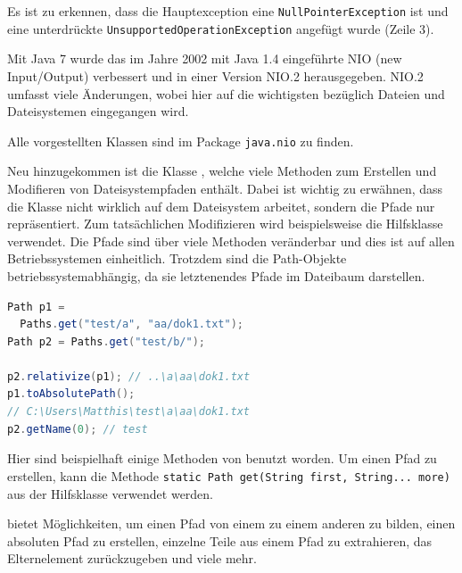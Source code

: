 \documentclass[times, 10pt,twocolumn]{article}
\begin{document}
Es ist zu erkennen, dass die Hauptexception eine \texttt{NullPointerException} ist und eine unterdrückte 
\texttt{UnsupportedOperationException} angefügt wurde (Zeile 3).

Mit Java 7 wurde das im Jahre 2002 mit Java 1.4 eingeführte NIO (new Input/Output) verbessert und in einer Version NIO.2
herausgegeben.\cite{v2bJava7} NIO.2 umfasst viele Änderungen, wobei hier auf die wichtigsten bezüglich Dateien und
Dateisystemen eingegangen wird.

Alle vorgestellten Klassen sind im Package \texttt{java.nio} zu finden.

Neu hinzugekommen ist die Klasse , welche viele Methoden zum Erstellen und Modifieren von Dateisystempfaden enthält. Dabei ist
wichtig zu erwähnen, dass die Klasse nicht wirklich auf dem Dateisystem arbeitet, sondern die Pfade nur repräsentiert. Zum tatsächlichen
Modifizieren wird beispielsweise die Hilfsklasse  verwendet. Die Pfade sind über viele Methoden veränderbar und dies ist auf
allen Betriebssystemen einheitlich. Trotzdem sind die Path-Objekte betriebssystemabhängig, da sie letztenendes Pfade 
im Dateibaum darstellen.
\begin{lstlisting}[language=java,breaklines=true]
Path p1 = 
  Paths.get("test/a", "aa/dok1.txt");
Path p2 = Paths.get("test/b/");

p2.relativize(p1); // ..\a\aa\dok1.txt
p1.toAbsolutePath(); 
// C:\Users\Matthis\test\a\aa\dok1.txt
p2.getName(0); // test
\end{lstlisting}
Hier sind beispielhaft einige Methoden von  benutzt worden. Um einen Pfad zu erstellen, kann die 
Methode \texttt{static Path get(String first, String... more)} aus der Hilfsklasse  verwendet werden.

 bietet Möglichkeiten, um einen Pfad von einem zu einem anderen zu bilden, einen absoluten Pfad zu erstellen,
einzelne Teile aus einem Pfad zu extrahieren, das Elternelement zurückzugeben und viele mehr.
\end{document}
